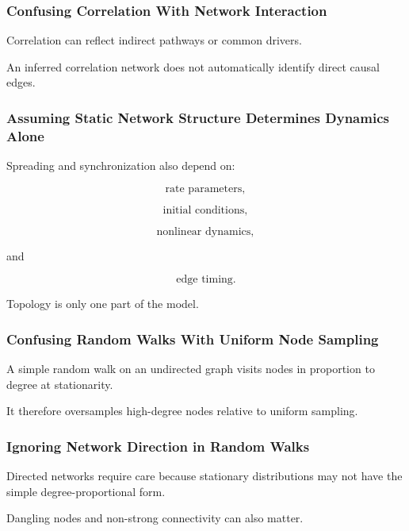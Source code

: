 \subsubsection{Confusing Correlation With Network Interaction}

Correlation can reflect indirect pathways or common drivers.

An inferred correlation network does not automatically identify direct
causal edges.

\subsubsection{Assuming Static Network Structure Determines Dynamics Alone}

Spreading and synchronization also depend on:

\[
\boxed{
\text{rate parameters},
}
\]

\[
\boxed{
\text{initial conditions},
}
\]

\[
\boxed{
\text{nonlinear dynamics},
}
\]

and

\[
\boxed{
\text{edge timing}.
}
\]

Topology is only one part of the model.

\subsubsection{Confusing Random Walks With Uniform Node Sampling}

A simple random walk on an undirected graph visits nodes in proportion to
degree at stationarity.

It therefore oversamples high-degree nodes relative to uniform sampling.

\subsubsection{Ignoring Network Direction in Random Walks}

Directed networks require care because stationary distributions may not have
the simple degree-proportional form.

Dangling nodes and non-strong connectivity can also matter.

